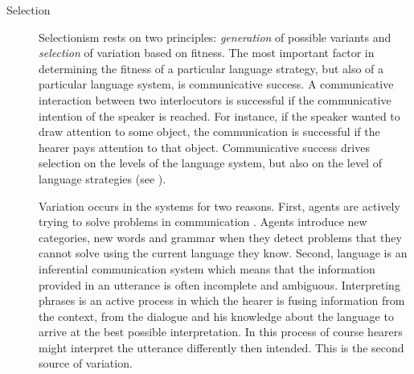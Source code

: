 \begin{description}
\item[Selection]
Selectionism rests on two principles: \emph{generation} of
possible variants and \emph{selection} of variation based on fitness. 
The most important factor in determining the fitness of a 
particular language strategy, but also
of a particular language system, is communicative success.
A communicative interaction between two interlocutors is successful if the
communicative intention of the speaker is reached. For instance, if the speaker
wanted to draw attention to some object, the communication is successful if the
hearer pays attention to that object. Communicative success drives selection
on the levels of the language system, but also on the level of language
strategies (see ). 

Variation occurs in the systems for two reasons. 
First, agents are actively trying to solve 
problems in communication \citep{steels2000language}. 
Agents introduce new categories, 
new words and grammar when they detect problems that they 
cannot solve using the current
language they know. Second, language is an inferential 
communication system \citep{sperber1986relevance} which means 
that the information provided in an utterance is often 
incomplete and ambiguous. Interpreting phrases is an active 
process in which the hearer
is fusing information from the context, from the dialogue 
and his knowledge about the language 
to arrive at the best possible interpretation. In this process 
of course hearers might interpret
the utterance differently then intended. This is the 
second source of variation.


\end{description}
